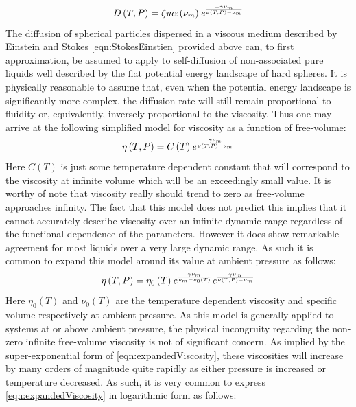 \begin{equation}
	\centering
	D\left(T,P\right)=\zeta u\alpha\left(\nu_{m}\right)\exponential{\frac{-\gamma\nu_{m}}{\nu\left(T,P\right)-\nu_{m}}}
\end{equation}
The diffusion of spherical particles dispersed in a viscous medium described by Einstein and Stokes \via \eqn\nolinebreak \ref{eqn:StokesEinstien} provided above can, to first approximation, be assumed to apply to self-diffusion of non-associated pure liquids well described by the flat potential energy landscape of hard spheres.  It is physically reasonable to assume that, even when the potential energy landscape is significantly more complex, the diffusion rate will still remain proportional to fluidity or, equivalently, inversely proportional to the viscosity.  Thus one may arrive at the following simplified model for viscosity as a function of free-volume:
\begin{equation}
	\centering
	\eta\left(T,P\right)=C\left(T\right)\exponential{\frac{\gamma \nu_{m}}{\nu\left(T,P\right)-\nu_{m}}}
	\label{eqn:absoluteViscosity}
\end{equation}
Here $C\left(T\right)$ is just some temperature dependent constant that will correspond to the viscosity at infinite volume which will be an exceedingly small value.  It is worthy of note that viscosity really should trend to zero as free-volume approaches infinity.  The fact that this model does not predict this implies that it cannot accurately describe viscosity over an infinite dynamic range regardless of the functional dependence of the parameters.  However it does show remarkable agreement for most liquids over a very large dynamic range.  As such it is common to expand this model around its value at ambient pressure as follows:
\begin{equation}
	\centering
	\eta\left(T,P\right)=\eta_0\left(T\right)\exponential{\frac{\gamma \nu_{m}}{\nu_{m}-\nu_0\left(T\right)}}\exponential{\frac{\gamma \nu_{m}}{\nu\left(T,P\right)-\nu_{m}}}
	\label{eqn:expandedViscosity}
\end{equation}
Here $\eta_0\left(T\right)$ and $\nu_0\left(T\right)$ are the temperature dependent viscosity and specific volume respectively at ambient pressure.  As this model is generally applied to systems at or above ambient pressure, the physical incongruity regarding the non-zero infinite free-volume viscosity is not of significant concern.  As implied by the super-exponential form of \eqn\nolinebreak \ref{eqn:expandedViscosity}, these viscosities will increase by many orders of magnitude quite rapidly as either pressure is increased or temperature decreased.  As such, it is very common to express \eqn\nolinebreak \ref{eqn:expandedViscosity} in logarithmic form as follows:

